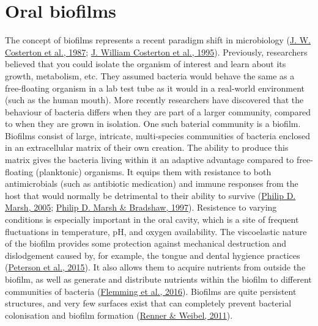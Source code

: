 \documentclass[
  letterpaper,
]{book}
\begin{document}
\hypertarget{background-biofilms}{%
\section{Oral biofilms}\label{background-biofilms}}

The concept of biofilms represents a recent paradigm shift in
microbiology (\protect\hyperlink{ref-costertonBacterialBiofilms1987}{J.
W. Costerton et al., 1987};
\protect\hyperlink{ref-costertonMicrobialBiofilms1995}{J. William
Costerton et al., 1995}). Previously, researchers believed that you
could isolate the organism of interest and learn about its growth,
metabolism, etc. They assumed bacteria would behave the same as a
free-floating organism in a lab test tube as it would in a real-world
environment (such as the human mouth). More recently researchers have
discovered that the behaviour of bacteria differs when they are part of
a larger community, compared to when they are grown in isolation. One
such baterial community is a biofilm. Biofilms consist of large,
intricate, multi-species communities of bacteria enclosed in an
extracellular matrix of their own creation. The ability to produce this
matrix gives the bacteria living within it an adaptive advantage
compared to free-floating (planktonic) organisms. It equips them with
resistance to both antimicrobials (such as antibiotic medication) and
immune responses from the host that would normally be detrimental to
their ability to survive
(\protect\hyperlink{ref-marshDentalPlaque2005}{Philip D. Marsh, 2005};
\protect\hyperlink{ref-marshPhysiologicalApproaches1997}{Philip D. Marsh
\& Bradshaw, 1997}). Resistence to varying conditions is especially
important in the oral cavity, which is a site of frequent fluctuations
in temperature, pH, and oxygen availability. The viscoelastic nature of
the biofilm provides some protection against mechanical destruction and
dislodgement caused by, for example, the tongue and dental hygience
practices
(\protect\hyperlink{ref-petersonViscoelasticityBiofilms2015}{Peterson et
al., 2015}). It also allows them to acquire nutrients from outside the
biofilm, as well as generate and distribute nutrients within the biofilm
to different communities of bacteria
(\protect\hyperlink{ref-flemmingBiofilmsEmergent2016}{Flemming et al.,
2016}). Biofilms are quite persistent structures, and very few surfaces
exist that can completely prevent bacterial colonisation and biofilm
formation
(\protect\hyperlink{ref-rennerPhysicochemicalRegulation2011}{Renner \&
Weibel, 2011}).
\end{document}
